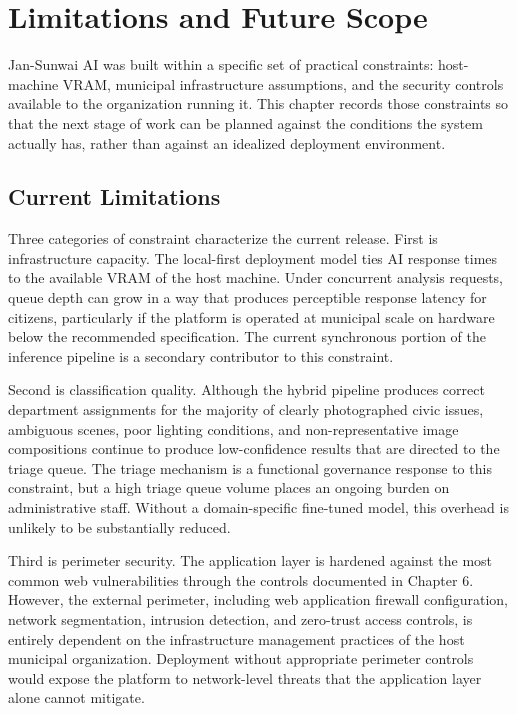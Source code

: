 \chapter{Limitations and Future Scope}

Jan-Sunwai AI was built within a specific set of practical constraints: host-machine VRAM, municipal infrastructure assumptions, and the security controls available to the organization running it. This chapter records those constraints so that the next stage of work can be planned against the conditions the system actually has, rather than against an idealized deployment environment.

\section{Current Limitations}

Three categories of constraint characterize the current release. First is infrastructure capacity. The local-first deployment model ties AI response times to the available VRAM of the host machine. Under concurrent analysis requests, queue depth can grow in a way that produces perceptible response latency for citizens, particularly if the platform is operated at municipal scale on hardware below the recommended specification. The current synchronous portion of the inference pipeline is a secondary contributor to this constraint.

Second is classification quality. Although the hybrid pipeline produces correct department assignments for the majority of clearly photographed civic issues, ambiguous scenes, poor lighting conditions, and non-representative image compositions continue to produce low-confidence results that are directed to the triage queue. The triage mechanism is a functional governance response to this constraint, but a high triage queue volume places an ongoing burden on administrative staff. Without a domain-specific fine-tuned model, this overhead is unlikely to be substantially reduced.

Third is perimeter security. The application layer is hardened against the most common web vulnerabilities through the controls documented in Chapter 6. However, the external perimeter, including web application firewall configuration, network segmentation, intrusion detection, and zero-trust access controls, is entirely dependent on the infrastructure management practices of the host municipal organization. Deployment without appropriate perimeter controls would expose the platform to network-level threats that the application layer alone cannot mitigate.

